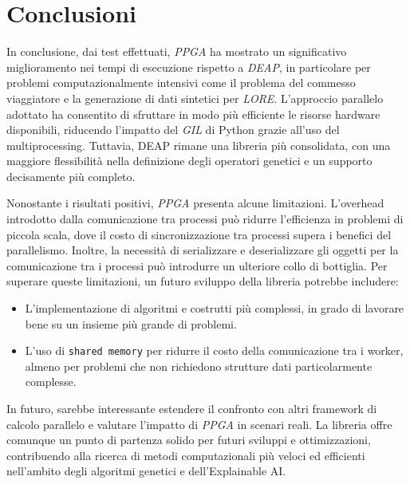 \chapter{Conclusioni}\label{cap: conclusions}

In conclusione, dai test effettuati, \textit{PPGA} ha mostrato un significativo
miglioramento nei tempi di esecuzione rispetto a \textit{DEAP}, in particolare
per problemi computazionalmente intensivi come il problema del commesso
viaggiatore e la generazione di dati sintetici per \textit{LORE}. L'approccio
parallelo adottato ha consentito di sfruttare in modo più efficiente le risorse
hardware disponibili, riducendo l'impatto del \textit{GIL} di Python grazie
all'uso del multiprocessing. Tuttavia, DEAP rimane una libreria più consolidata,
con una maggiore flessibilità nella definizione degli operatori genetici e un
supporto decisamente più completo.

Nonostante i risultati positivi, \textit{PPGA} presenta alcune limitazioni.
L'overhead introdotto dalla comunicazione tra processi può ridurre l'efficienza
in problemi di piccola scala, dove il costo di sincronizzazione tra processi
supera i benefici del parallelismo. Inoltre, la necessità di serializzare e
deserializzare gli oggetti per la comunicazione tra i processi può introdurre
un ulteriore collo di bottiglia. Per superare queste limitazioni, un futuro
sviluppo della libreria potrebbe includere:
\begin{itemize}
	\item L'implementazione di algoritmi e costrutti più complessi, in grado di
	      lavorare bene su un insieme più grande di problemi.
	\item L'uso di \verb|shared memory| per ridurre il costo della comunicazione
	      tra i worker, almeno per problemi che non richiedono strutture dati
	      particolarmente complesse.
\end{itemize}

In futuro, sarebbe interessante estendere il confronto con altri framework di
calcolo parallelo e valutare l'impatto di \textit{PPGA} in scenari reali.
La libreria offre comunque un punto di partenza solido per futuri sviluppi e
ottimizzazioni, contribuendo alla ricerca di metodi computazionali più veloci
ed efficienti nell'ambito degli algoritmi genetici e dell'Explainable AI.
